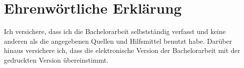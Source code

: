 \chapter*{Ehrenwörtliche Erklärung}
\thispagestyle{empty}
Ich versichere, dass ich die Bachelorarbeit selbstständig verfasst und keine anderen als die angegebenen Quellen und Hilfsmittel benutzt habe. 
Darüber hinaus versichere ich, dass die elektronische Version der Bachelorarbeit mit der gedruckten Version übereinstimmt.
